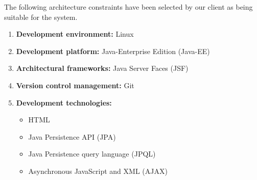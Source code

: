 \begin{flushleft}
	The following architecture constraints have 
	been selected by our client as being 
	suitable for the system.
\end{flushleft}

\begin{enumerate}
	
	\item \textbf{Development environment:} Linux
	\item \textbf{Development platform:} Java-Enterprise Edition (Java-EE) 
	\item \textbf{Architectural frameworks:} Java Server Faces (JSF)
	\item \textbf{Version control management:} Git
	\item \textbf{Development technologies:}
	
	\begin{itemize}
		\item HTML
		\item Java Persistence API (JPA)
		\item Java Persistence query language (JPQL)
		\item Asynchronous JavaScript and XML (AJAX)
	\end{itemize}
		
\end{enumerate}

